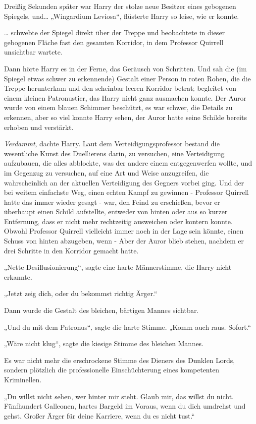 {Dreißig Sekunden später war Harry der stolze neue Besitzer eines gebogenen Spiegels, und… „Wingardium Leviosa“, flüsterte Harry so leise, wie er konnte.

… schwebte der Spiegel direkt über der Treppe und beobachtete in dieser gebogenen Fläche fast den gesamten Korridor, in dem Professor Quirrell unsichtbar wartete.

Dann hörte Harry es in der Ferne, das Geräusch von Schritten. Und sah die (im Spiegel etwas schwer zu erkennende) Gestalt einer Person in roten Roben, die die Treppe herunterkam und den scheinbar leeren Korridor betrat; begleitet von einem kleinen Patronustier, das Harry nicht ganz ausmachen konnte. Der Auror wurde von einem blauen Schimmer beschützt, es war schwer, die Details zu erkennen, aber so viel konnte Harry sehen, der Auror hatte seine Schilde bereits erhoben und verstärkt.

\emph{Verdammt}, dachte Harry. Laut dem Verteidigungsprofessor bestand die wesentliche Kunst des Duellierens darin, zu versuchen, eine Verteidigung aufzubauen, die alles abblockte, was der andere einem entgegenwerfen wollte, und im Gegenzug zu versuchen, auf eine Art und Weise anzugreifen, die wahrscheinlich an der aktuellen Verteidigung des Gegners vorbei ging. Und der bei weitem einfachste Weg, einen echten Kampf zu gewinnen - Professor Quirrell hatte das immer wieder gesagt - war, den Feind zu erschießen, bevor er überhaupt einen Schild aufstellte, entweder von hinten oder aus so kurzer Entfernung, dass er nicht mehr rechtzeitig ausweichen oder kontern konnte. Obwohl Professor Quirrell vielleicht immer noch in der Lage sein könnte, einen Schuss von hinten abzugeben, wenn - Aber der Auror blieb stehen, nachdem er drei Schritte in den Korridor gemacht hatte.

„Nette Desillusionierung“, sagte eine harte Männerstimme, die Harry nicht erkannte.

„Jetzt zeig dich, oder du bekommst richtig Ärger.“

Dann wurde die Gestalt des bleichen, bärtigen Mannes sichtbar.

„Und du mit dem Patronus“, sagte die harte Stimme. „Komm auch raus. Sofort.“

„Wäre nicht klug“, sagte die kiesige Stimme des bleichen Mannes.

Es war nicht mehr die erschrockene Stimme des Dieners des Dunklen Lords, sondern plötzlich die professionelle Einschüchterung eines kompetenten Kriminellen.

„Du willst nicht sehen, wer hinter mir steht. Glaub mir, das willst du nicht. Fünfhundert Galleonen, hartes Bargeld im Voraus, wenn du dich umdrehst und gehst. Großer Ärger für deine Karriere, wenn du es nicht tust.“

}
